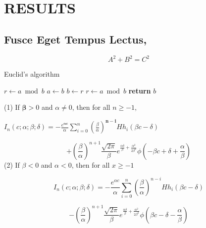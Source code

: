 \chapter{RESULTS} \label{results}

\section{Fusce Eget Tempus Lectus, }

\begin{equation}
A^2 + B^2 = C^2
\end{equation}

\begin{algorithm}  {Euclid’s algorithm}
\singlespacing

\begin{algorithmic}[1]
\State $r\gets a\bmod b$
\State $a\gets b$
\State $b\gets r$
\State $r\gets a\bmod b$
\EndWhile\label{euclidendwhile}
\State \textbf{return} $b$
\EndProcedure
\end{algorithmic}
\end{algorithm}










(1) If $\bm{\beta}>0$ and $\alpha\neq0$, then for all $n\geq-1$,

$I_{n}(c;\alpha; \beta; \delta) = - \frac{e^{\bm{\alpha c}}}{\alpha} \sum_{i=0}^{n}(\frac{\beta}{\alpha})^{\bm{n-i}} Hh_{i}(\beta c -\delta)$

$$+ (\frac{\beta}{\alpha})^{n+1} \frac{\sqrt{2 \pi}}{\beta} e^{\frac{\alpha \delta}{\beta}+\frac{\alpha^{2}}{2\beta^{2}}} \phi(-\beta c + \delta + \frac{\alpha}{\beta})$$
(2) If $\beta<0$ and $\alpha<0$, then for all $x \geq -1$

$$I_{n}(c;\alpha; \beta; \delta) = - \frac{e^{\alpha c}}{\alpha} \sum_{i=0}^{n}(\frac{\beta}{\alpha})^{n-i} Hh_{i}(\beta c -\delta)$$

$$- (\frac{\beta}{\alpha})^{n+1} \frac{\sqrt{2 \pi}}{\beta} e^{\frac{\alpha \delta}{\beta}+\frac{\alpha^{2}}{2\beta^{2}}} \phi(\beta c - \delta - \frac{\alpha}{\beta})$$

